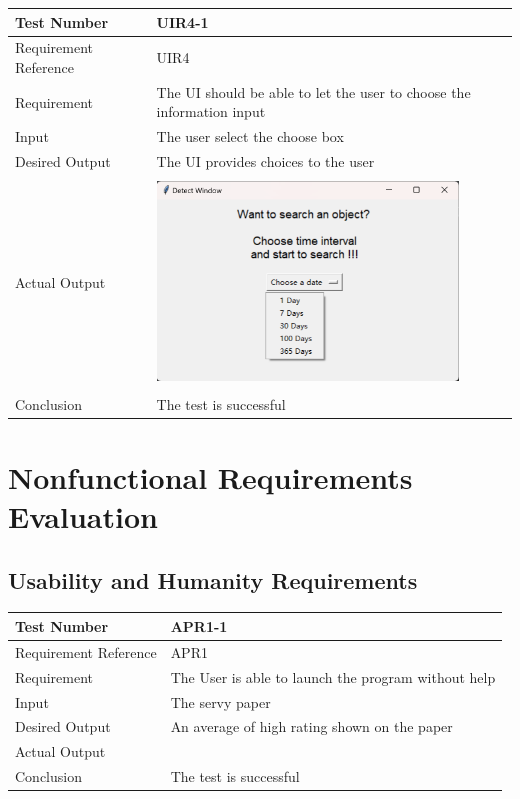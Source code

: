 \documentclass[12pt, titlepage]{article}
\begin{document}
\begin{table}[H]
\begin{center}
\begin{tabular}{|l | m{9cm}|}
\hline
  Test Number & UIR4-1\\
  \hline
  Requirement Reference & UIR4\\
  \hline
  Requirement & The UI should be able to let the user to choose the information input\\
  \hline
  Input & The user select the choose box\\
  \hline
  Desired Output & The UI provides choices to the user\\
  \hline
  Actual Output & \includegraphics[width=80mm, height=55mm]{UIR41.png}\\
  \hline
  Conclusion & The test is successful\\
  \hline
\end{tabular}
\end{center}           
\end{table}

\section{Nonfunctional Requirements Evaluation}

\subsection{Usability and Humanity Requirements}

\begin{table}[H]
\begin{center}
\begin{tabular}{|l | m{9cm}|}
\hline
  Test Number & APR1-1\\
  \hline
  Requirement Reference & APR1\\
  \hline
  Requirement & The User is able to launch the program without help\\
  \hline
  Input & The servy paper\\
  \hline
  Desired Output & An average of high rating shown on the paper\\
  \hline
  Actual Output &\\
  \hline
  Conclusion & The test is successful\\
  \hline
\end{tabular}
\end{center}           
\end{table}
\end{document}

